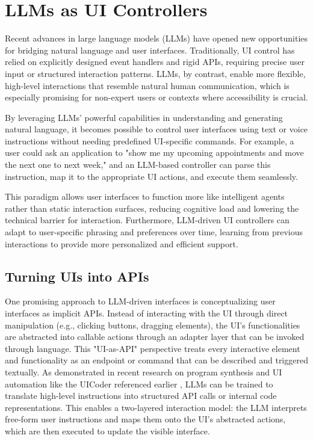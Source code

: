 \documentclass[openany]{book}
\begin{document}
\section{LLMs as UI Controllers}
Recent advances in large language models (LLMs) have opened new opportunities for bridging natural language and user interfaces. Traditionally, UI control has relied on explicitly designed event handlers and rigid APIs, requiring precise user input or structured interaction patterns. LLMs, by contrast, enable more flexible, high-level interactions that resemble natural human communication, which is especially promising for non-expert users or contexts where accessibility is crucial.

By leveraging LLMs' powerful capabilities in understanding and generating natural language, it becomes possible to control user interfaces using text or voice instructions without needing predefined UI-specific commands. For example, a user could ask an application to "show me my upcoming appointments and move the next one to next week," and an LLM-based controller can parse this instruction, map it to the appropriate UI actions, and execute them seamlessly.

This paradigm allows user interfaces to function more like intelligent agents rather than static interaction surfaces, reducing cognitive load and lowering the technical barrier for interaction. Furthermore, LLM-driven UI controllers can adapt to user-specific phrasing and preferences over time, learning from previous interactions to provide more personalized and efficient support.

\subsection{Turning UIs into APIs}
One promising approach to LLM-driven interfaces is conceptualizing user interfaces as implicit APIs. Instead of interacting with the UI through direct manipulation (e.g., clicking buttons, dragging elements), the UI's functionalities are abstracted into callable actions through an adapter layer that can be invoked through language.
This "UI-as-API" perspective treats every interactive element and functionality as an endpoint or command that can be described and triggered textually. As demonstrated in recent research on program synthesis and UI automation like the UICoder referenced earlier \cite{Wu2024, chen2023programmaticui}, LLMs can be trained to translate high-level instructions into structured API calls or internal code representations. This enables a two-layered interaction model: the LLM interprets free-form user instructions and maps them onto the UI's abstracted actions, which are then executed to update the visible interface.
\end{document}
